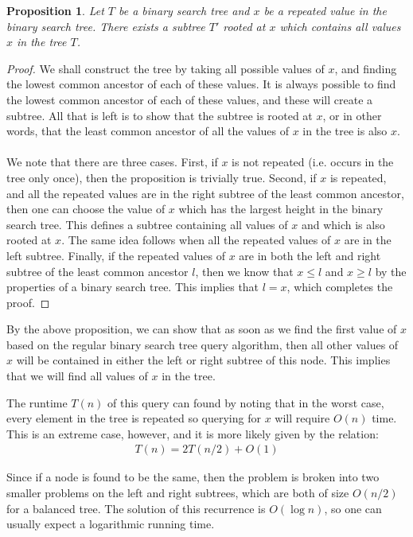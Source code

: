 \documentclass[12pt]{article}
\newtheorem{proposition}[theorem]{Proposition}
\begin{document}
  \begin{proposition}
    Let $T$ be a binary search tree and $x$ be a repeated value in the binary search tree. There exists a subtree $T'$ rooted at $x$ which contains all values $x$ in the tree $T$.
  \end{proposition}
  \begin{proof}
    We shall construct the tree by taking all possible values of $x$, and finding the lowest common ancestor of each of these values. It is always possible to find the lowest common ancestor of each of these values, and these will create a subtree. All that is left is to show that the subtree is rooted at $x$, or in other words, that the least common ancestor of all the values of $x$ in the tree is also $x$. \\ \\
We note that there are three cases. First, if $x$ is not repeated (i.e. occurs in the tree only once), then the proposition is trivially true. Second, if $x$ is repeated, and all the repeated values are in the right subtree of the least common ancestor, then one can choose the value of $x$ which has the largest height in the binary search tree. This defines a subtree containing all values of $x$ and which is also rooted at $x$. The same idea follows when all the repeated values of $x$ are in the left subtree. Finally, if the repeated values of $x$ are in both the left and right subtree of the least common ancestor $l$, then we know that $x \leq l$ and $x \geq l$ by the properties of a binary search tree. This implies that $l = x$, which completes the proof.
  \end{proof}

By the above proposition, we can show that as soon as we find the first value of $x$ based on the regular binary search tree query algorithm, then all other values of $x$ will be contained in either the left or right subtree of this node. This implies that we will find all values of $x$ in the tree.

The runtime $T(n)$ of this query can found by noting that in the worst case, every element in the tree is repeated so querying for $x$ will require $O(n)$ time. This is an extreme case, however, and it is more likely given by the relation:
\begin{eqnarray}
  T(n) = 2 T(n/2) + O(1)
\end{eqnarray}

Since if a node is found to be the same, then the problem is broken into two smaller problems on the left and right subtrees, which are both of size $O(n/2)$ for a balanced tree. The solution of this recurrence is $O(\log n)$, so one can usually expect a logarithmic running time.
\end{document}
